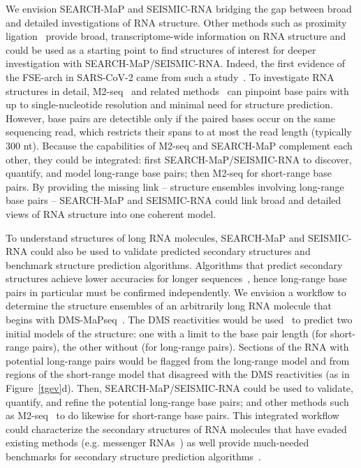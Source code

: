 \documentclass[main.tex]{subfiles}
\begin{document}
We envision SEARCH-MaP and SEISMIC-RNA bridging the gap between broad and detailed investigations of RNA structure.
Other methods such as proximity ligation~\cite{Aw2016,Lu2016,Sharma2016,Ziv2018,vanDamme2022} provide broad, transcriptome-wide information on RNA structure and could be used as a starting point to find structures of interest for deeper investigation with SEARCH-MaP/SEISMIC-RNA.
Indeed, the first evidence of the FSE-arch in SARS-CoV-2 came from such a study~\cite{Ziv2020}.
To investigate RNA structures in detail, M2-seq~\cite{Cheng2017} and related methods~\cite{Cordero2015} can pinpoint base pairs with up to single-nucleotide resolution and minimal need for structure prediction.
However, base pairs are detectible only if the paired bases occur on the same sequencing read, which restricts their spans to at most the read length (typically 300 nt).
Because the capabilities of M2-seq and SEARCH-MaP complement each other, they could be integrated: first SEARCH-MaP/SEISMIC-RNA to discover, quantify, and model long-range base pairs; then M2-seq for short-range base pairs.
By providing the missing link -- structure ensembles involving long-range base pairs -- SEARCH-MaP and SEISMIC-RNA could link broad and detailed views of RNA structure into one coherent model.

To understand structures of long RNA molecules, SEARCH-MaP and SEISMIC-RNA could also be used to validate predicted secondary structures and benchmark structure prediction algorithms.
Algorithms that predict secondary structures achieve lower accuracies for longer sequences~\cite{Doshi2004,Nicholson2015}, hence long-range base pairs in particular must be confirmed independently.
We envision a workflow to determine the structure ensembles of an arbitrarily long RNA molecule that begins with DMS-MaPseq~\cite{Zubradt2016}.
The DMS reactivities would be used~\cite{Cordero2012} to predict two initial models of the structure: one with a limit to the base pair length (for short-range pairs), the other without (for long-range pairs).
Sections of the RNA with potential long-range pairs would be flagged from the long-range model and from regions of the short-range model that disagreed with the DMS reactivities (as in Figure~\ref{tgev}d).
Then, SEARCH-MaP/SEISMIC-RNA could be used to validate, quantify, and refine the potential long-range base pairs; and other methods such as M2-seq~\cite{Cheng2017} to do likewise for short-range base pairs.
This integrated workflow could characterize the secondary structures of RNA molecules that have evaded existing methods (e.g. messenger RNAs~\cite{Lange2012}) as well provide much-needed benchmarks for secondary structure prediction algorithms~\cite{Mathews2019}.
\end{document}
